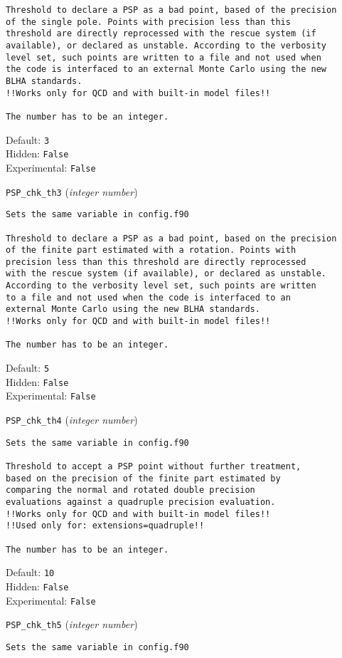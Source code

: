 \begin{basedescript}{\desclabelstyle{\pushlabel}}
\begin{verbatim}
Threshold to declare a PSP as a bad point, based of the precision
of the single pole. Points with precision less than this
threshold are directly reprocessed with the rescue system (if
available), or declared as unstable. According to the verbosity
level set, such points are written to a file and not used when
the code is interfaced to an external Monte Carlo using the new
BLHA standards.
!!Works only for QCD and with built-in model files!!

The number has to be an integer.
\end{verbatim}
Default: \verb|3|
\\Hidden: \verb|False|
\\Experimental: \verb|False|
\\\item[\colorbox{gray!30}{\texttt{PSP\_chk\_th3}}] (\textit{integer number})
\begin{verbatim}
Sets the same variable in config.f90

Threshold to declare a PSP as a bad point, based on the precision
of the finite part estimated with a rotation. Points with
precision less than this threshold are directly reprocessed
with the rescue system (if available), or declared as unstable.
According to the verbosity level set, such points are written
to a file and not used when the code is interfaced to an
external Monte Carlo using the new BLHA standards.
!!Works only for QCD and with built-in model files!!

The number has to be an integer.
\end{verbatim}
Default: \verb|5|
\\Hidden: \verb|False|
\\Experimental: \verb|False|
\\\item[\colorbox{gray!30}{\texttt{PSP\_chk\_th4}}] (\textit{integer number})
\begin{verbatim}
Sets the same variable in config.f90

Threshold to accept a PSP point without further treatment,
based on the precision of the finite part estimated by
comparing the normal and rotated double precision
evaluations against a quadruple precision evaluation.
!!Works only for QCD and with built-in model files!!
!!Used only for: extensions=quadruple!!

The number has to be an integer.
\end{verbatim}
Default: \verb|10|
\\Hidden: \verb|False|
\\Experimental: \verb|False|
\\\item[\colorbox{gray!30}{\texttt{PSP\_chk\_th5}}] (\textit{integer number})
\begin{verbatim}
Sets the same variable in config.f90


\end{verbatim}
\end{basedescript}
